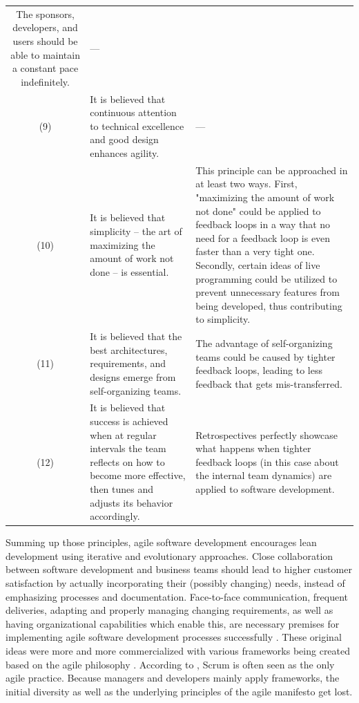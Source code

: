 \begin{block}
\begin{ThreePartTable}
\begin{longtable}{@{}cp{}p{}@{}}
    The sponsors, developers, and users should be able to maintain a constant pace indefinitely.&
    ---
    \\
    (9) &
    It is believed that continuous attention to technical excellence and good design enhances agility.&
    ---
    \\
    (10) &
    It is believed that simplicity – the art of maximizing the amount of work not done – is essential.&
    This principle can be approached in at least two ways.
    First, "maximizing the amount of work not done" could be applied to feedback loops in a way that no need for a feedback loop is even faster than a very tight one.
    Secondly, certain ideas of live programming could be utilized to prevent unnecessary features from being developed, thus contributing to simplicity.
    \\
    (11) &
    It is believed that the best architectures, requirements, and designs emerge from self-organizing teams.&
    The advantage of self-organizing teams could be caused by tighter feedback loops, leading to less feedback that gets mis-transferred.
    \\
    (12)&
    It is believed that success is achieved when at regular intervals the team reflects on how to become more effective, then tunes and adjusts its behavior accordingly.&
    Retrospectives perfectly showcase what happens when tighter feedback loops (in this case about the internal team dynamics) are applied to software development.
    \\
    \bottomrule
\end{longtable}
\end{ThreePartTable}
\end{block}

Summing up those principles, agile software development encourages lean development using iterative and evolutionary approaches.
Close collaboration between software development and business teams should lead to higher customer satisfaction by actually incorporating their (possibly changing) needs, instead of emphasizing processes and documentation.
Face-to-face communication, frequent deliveries, adapting and properly managing changing requirements, as well as having organizational capabilities which enable this, are necessary premises for implementing agile software development processes successfully \cite{misra_agile_2012}.
These original ideas were more and more commercialized with various frameworks being created based on the agile philosophy \cite{hohl_back_2018}.
According to \citeauthor{hohl_back_2018}, Scrum is often seen as the only agile practice.
Because managers and developers mainly apply frameworks, the initial diversity as well as the underlying principles of the agile manifesto get lost.


